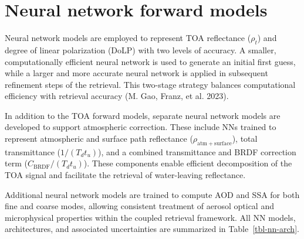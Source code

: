 \documentclass[
  11pt,
  letterpaper,
  DIV=11,
  numbers=noendperiod]{scrreprt}
\begin{document}
\section{Neural network forward
models}\label{neural-network-forward-models}

Neural network models are employed to represent TOA reflectance
(\(\rho_t\)) and degree of linear polarization (DoLP) with two levels of
accuracy. A smaller, computationally efficient neural network is used to
generate an initial first guess, while a larger and more accurate neural
network is applied in subsequent refinement steps of the retrieval. This
two-stage strategy balances computational efficiency with retrieval
accuracy (M. Gao, Franz, et al. 2023).

In addition to the TOA forward models, separate neural network models
are developed to support atmospheric correction. These include NNs
trained to represent atmospheric and surface path reflectance
(\(\rho_{\mathrm{atm+surface}}\)), total transmittance
(\(1/(T_d t_u)\)), and a combined transmittance and BRDF correction term
(\(C_{\mathrm{BRDF}}/(T_d t_u)\)). These components enable efficient
decomposition of the TOA signal and facilitate the retrieval of
water-leaving reflectance.

Additional neural network models are trained to compute AOD and SSA for
both fine and coarse modes, allowing consistent treatment of aerosol
optical and microphysical properties within the coupled retrieval
framework. All NN models, architectures, and associated uncertainties
are summarized in Table~\ref{tbl-nn-arch}.
\end{document}
